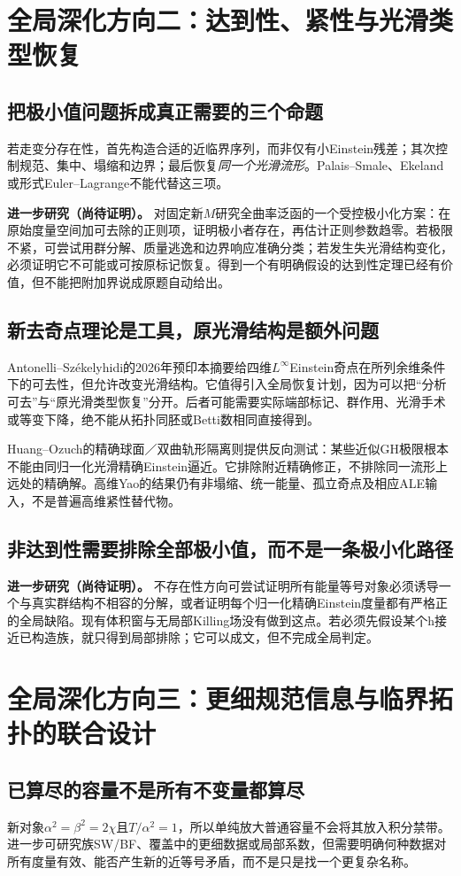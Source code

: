 \documentclass[UTF8,fontset=fandol,zihao=-4]{ctexart}
\theoremstyle{cn}
\newcommand{\newidea}{\par\noindent\textbf{进一步研究（尚待证明）。}}
\begin{document}
\section{全局深化方向二：达到性、紧性与光滑类型恢复}
\subsection{把极小值问题拆成真正需要的三个命题}
若走变分存在性，首先构造合适的近临界序列，而非仅有小Einstein残差；其次控制规范、集中、塌缩和边界；最后恢复\emph{同一个光滑流形}。Palais--Smale、Ekeland或形式Euler--Lagrange不能代替这三项。

\newidea
对固定新$M$研究全曲率泛函的一个受控极小化方案：在原始度量空间加可去除的正则项，证明极小者存在，再估计正则参数趋零。若极限不紧，可尝试用群分解、质量逃逸和边界响应准确分类；若发生失光滑结构变化，必须证明它不可能或可按原标记恢复。得到一个有明确假设的达到性定理已经有价值，但不能把附加界说成原题自动给出。

\subsection{新去奇点理论是工具，原光滑结构是额外问题}
Antonelli--Székelyhidi的2026年预印本摘要给四维$L^\infty$Einstein奇点在所列余维条件下的可去性，但允许改变光滑结构\cite{AS}。它值得引入全局恢复计划，因为可以把“分析可去”与“原光滑类型恢复”分开。后者可能需要实际端部标记、群作用、光滑手术或等变下降，绝不能从拓扑同胚或Betti数相同直接得到。

Huang--Ozuch的精确球面／双曲轨形隔离\cite{HO}则提供反向测试：某些近似GH极限根本不能由同归一化光滑精确Einstein逼近。它排除附近精确修正，不排除同一流形上远处的精确解。高维Yao的结果\cite{Yao}仍有非塌缩、统一能量、孤立奇点及相应ALE输入，不是普遍高维紧性替代物。

\subsection{非达到性需要排除全部极小值，而不是一条极小化路径}
\newidea
不存在性方向可尝试证明所有能量等号对象必须诱导一个与真实群结构不相容的分解，或者证明每个归一化精确Einstein度量都有严格正的全局缺陷。现有体积窗与无局部Killing场没有做到这点。若必须先假设某个h接近已构造族，就只得到局部排除；它可以成文，但不完成全局判定。

\section{全局深化方向三：更细规范信息与临界拓扑的联合设计}
\subsection{已算尽的容量不是所有不变量都算尽}
新对象$\alpha^2=\beta^2=2\chi$且$T/\alpha^2=1$，所以单纯放大普通容量不会将其放入积分禁带。进一步可研究族SW/BF、覆盖中的更细数据或局部系数，但需要明确何种数据对所有度量有效、能否产生新的近等号矛盾，而不是只是找一个更复杂名称。
\end{document}

